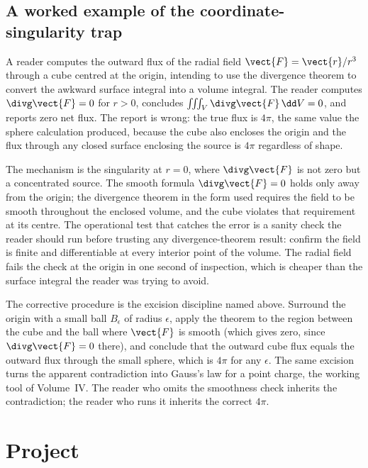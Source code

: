 \subsection{A worked example of the coordinate-singularity trap}

A reader computes the outward flux of the radial field $\vect{F} =
\vect{r}/r^{3}$ through a cube centred at the origin, intending to use
the divergence theorem to convert the awkward surface integral into a
volume integral. The reader computes $\divg\vect{F} = 0$ for $r > 0$,
concludes $\iiint_{V}\divg\vect{F}\,\dd V = 0$, and reports zero net
flux. The report is wrong: the true flux is $4\pi$, the same value the
sphere calculation produced, because the cube also encloses the
origin and the flux through any closed surface enclosing the source is
$4\pi$ regardless of shape.

The mechanism is the singularity at $r = 0$, where $\divg\vect{F}$ is
not zero but a concentrated source. The smooth formula $\divg\vect{F}
= 0$ holds only away from the origin; the divergence theorem in the
form used requires the field to be smooth throughout the enclosed
volume, and the cube violates that requirement at its centre. The
operational test that catches the error is a sanity check the reader
should run before trusting any divergence-theorem result: confirm the
field is finite and differentiable at every interior point of the
volume. The radial field fails the check at the origin in one second
of inspection, which is cheaper than the surface integral the reader
was trying to avoid.

The corrective procedure is the excision discipline named above.
Surround the origin with a small ball $B_{\epsilon}$ of radius
$\epsilon$, apply the theorem to the region between the cube and the
ball where $\vect{F}$ is smooth (which gives zero, since
$\divg\vect{F} = 0$ there), and conclude that the outward cube flux
equals the outward flux through the small sphere, which is $4\pi$ for
any $\epsilon$. The same excision turns the apparent contradiction
into Gauss's law for a point charge, the working tool of Volume~IV.
The reader who omits the smoothness check inherits the contradiction;
the reader who runs it inherits the correct $4\pi$.

\section{Project}

